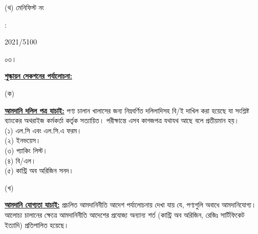 \documentclass[12pt]{article}
\newcommand{\rotno}{2021/5100}
\begin{document}
\begin{minipage}[t]{0.45\linewidth}
(থ) মেনিফিস্ট নং
\end{minipage}
\begin{minipage}[t]{0.02\linewidth}
:
\end{minipage}
\begin{minipage}[t]{0.50\linewidth}
{\rotno}
\\
\end{minipage}
\normalsize
\begin{minipage}[t]{0.05\linewidth}
০৩।
\end{minipage}
\begin{minipage}[t]{0.95\linewidth}
\underline{\textbf{শুল্কায়ন সেকশনের পর্যালোচনা:}}
\end{minipage}
\begin{minipage}[t]{0.05\linewidth}
\hspace{1em}
\end{minipage}
\begin{minipage}[t]{0.05\linewidth}
(ক)
\end{minipage}
\begin{minipage}[t]{0.90\linewidth}
\underline{\textbf{আমদানি দলিল পত্র যাচাই:}}
পণ্য চালান খালাসের জন্য নিম্নবর্ণিত দলিলাদিসহ বি/ই দাখিল করা
হয়েছে যা সংশ্লিষ্ট ব্যাংকের অথরাইজ কর্মকর্তা কর্তৃক সত্যায়িত।
পরীক্ষান্তে এসব কাগজপত্র যথাযথ আছে বলে প্রতীয়মান হয়।
\\
(১) এল.সি এবং এল.সি.এ ফরম।
\\
(২) ইনভয়েস।
\\
(৩) প্যাকিং লিস্ট।
\\
(৪) বি/এল।
\\
(৫) কান্ট্রি অব অরিজিন সনদ।
\\
\end{minipage}
\begin{minipage}[t]{0.05\linewidth}
\hspace{1em}
\end{minipage}
\begin{minipage}[t]{0.05\linewidth}
(খ)
\end{minipage}
\begin{minipage}[t]{0.90\linewidth}
\underline{\textbf{আমদানি যোগ্যতা যাচাই:}}
প্রচলিত আমদানিনীতি আদেশ পর্যালোচনায় দেখা যায় যে, পণ্যগুলি অবাধে আমদানিযোগ্য।
আলোচ্য চালানের ক্ষেত্রে আমদানিনীতি আদেশের প্রযোজ্য অন্যান্য শর্ত (কান্ট্রি অব অরিজিন, রেজিঃ
সার্টিফিকেট ইত্যাদি) প্রতিপালিত হয়েছে।
\\
\end{minipage}
\begin{minipage}[t]{0.05\linewidth}
\hspace{1em}
\end{minipage}
\end{document}
